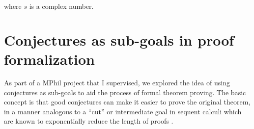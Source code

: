 where $s$ is a complex number.

\section{Conjectures as sub-goals in proof formalization}
    As part of a MPhil project that I supervised, we explored the idea of using conjectures as sub-goals to aid the process of formal theorem proving. The basic concept is that
    good conjectures can make it easier to prove the original theorem, in a manner analogous to a ``cut'' or intermediate goal in sequent calculi which are known to exponentially reduce the length of proofs \cite{}.